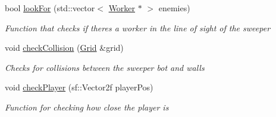 \begin{DoxyCompactItemize}
bool \mbox{\hyperlink{class_enemy_a6217993e1dcaae812723d71b2cdf496f}{look\+For}} (std\+::vector$<$ \mbox{\hyperlink{class_worker}{Worker}} $\ast$ $>$ enemies)
\begin{DoxyCompactList}\small\item\em Function that checks if theres a worker in the line of sight of the sweeper \end{DoxyCompactList}\item 
void \mbox{\hyperlink{class_enemy_a4ff22b3cf32aa1ce4a59bf04e9d55a50}{check\+Collision}} (\mbox{\hyperlink{class_grid}{Grid}} \&grid)
\begin{DoxyCompactList}\small\item\em Checks for collisions between the sweeper bot and walls \end{DoxyCompactList}\item 
void \mbox{\hyperlink{class_enemy_a27b3039c164f52c0a2427d9cca8cdf7c}{check\+Player}} (sf\+::\+Vector2f player\+Pos)
\begin{DoxyCompactList}\small\item\em Function for checking how close the player is \end{DoxyCompactList}\end{DoxyCompactItemize}
